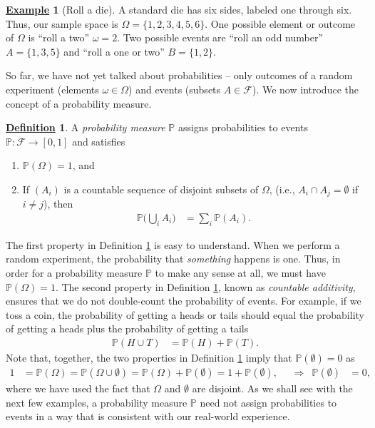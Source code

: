\documentclass[12pt]{book}
\numberwithin{equation}{chapter}
\theoremstyle{plain}
\numberwithin{theorem}{section}
\theoremstyle{definition}
\newtheorem{definition}[theorem]{\underline{Definition}}
\newtheorem{example}[theorem]{\underline{Example}}
\numberwithin{exercise}{chapter}
\newcommand{\<}{\langle}
\renewcommand{\>}{\rangle}
\renewcommand{\(}{\left(}
\renewcommand{\)}{\right)}
\renewcommand{\[}{\left[}
\renewcommand{\]}{\right]}
\newcommand\Pb{\mathds{P}}
\newcommand\Fc{\mathscr{F}}
\newcommand\om{\omega}
\newcommand\Om{\Omega}
\theoremstyle{definition}
\numberwithin{question}{section}
\begin{document}
\begin{example}[Roll a die]
A standard die has six sides, labeled one through six.  Thus, our sample space is $\Om = \{ 1, 2, 3, 4, 5, 6 \}$.  One possible element or outcome of $\Om$ is ``roll a two'' $\om = 2$.  Two possible events are ``roll an odd number'' $A = \{ 1, 3, 5 \}$ and ``roll a one or two'' $B = \{ 1, 2 \}$.
\end{example}

\noindent
So far, we have not yet talked about probabilities -- only outcomes of a random experiment (elements $\om \in \Om$) and events (subsets $A \in \Fc$).  We now introduce the concept of a probability measure.

\begin{definition}
\label{def:P}
A \textit{probability measure} $\Pb$ assigns probabilities to events $\Pb : \Fc \to [0,1]$ and satisfies
\begin{enumerate}
\item $\Pb( \Om ) = 1$, and
\item If $(A_i)$ is a countable sequence of disjoint subsets of $\Om$, (i.e., $A_i \cap A_j = \emptyset$ if $i \neq j$), then
\begin{align}
\Pb \Big( \bigcup_i A_i \Big)
	&=	\sum_i \Pb( A_i) .
\end{align}
\end{enumerate}
\end{definition}

\noindent
The first property in Definition \ref{def:P} is easy to understand.
When we perform a random experiment, the probability that \textit{something} happens is one.
Thus, in order for a probability measure $\Pb$ to make any sense at all, we must have $\Pb(\Om) = 1$.  
The second property in Definition \ref{def:P}, known as \textit{countable additivity}, ensures that we do not double-count the probability of events.
For example, if we toss a coin, the probability of getting a heads or tails should equal the probability of getting a heads plus the probability of getting a tails
\begin{align}
\Pb( H \cup T )
	&=	\Pb(H) + \Pb(T) .
\end{align}
Note that, together, the two properties in Definition \ref{def:P} imply that $\Pb(\emptyset) = 0$ as
\begin{align}
1 
	&= \Pb(\Om) = \Pb (\Om \cup \emptyset) = \Pb(\Om) + \Pb(\emptyset) = 1 + \Pb(\emptyset) , &
	&\Rightarrow&
\Pb(\emptyset)
	&=	0 ,
\end{align}
where we have used the fact that $\Om$ and $\emptyset$ are disjoint.
As we shall see with the next few examples, a probability measure $\Pb$ need not assign probabilities to events in a way that is consistent with our real-world experience.
\end{document}
